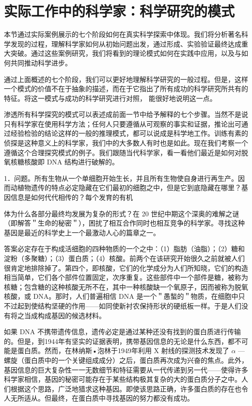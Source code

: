 \section{实际工作中的科学家：科学研究的模式}

\begin{logicbox}[title=引言]
本节通过实际案例展示的七个阶段如何在真实科学探索中体现。我们将分析著名科学发现的过程，理解科学家如何从初始问题出发，通过形成、实验验证最终达成重大突破。通过这些案例研究，我们将看到的理论模式如何在实践中应用，以及与如何共同推动科学进步。
\end{logicbox}

通过上面概述的七个阶段，我们可以更好地理解科学研究的一般过程。但是，这样一个模式的价值不在于抽象的描述，而在于它指出了所有成功的科学研究所共有的特征。将这一模式与成功的科学研究进行对照， 能很好地说明这一点。

渗透所有科学探究的模式可以表述成前面一节中给予解释的七个步骤。当然不是说只有科学家在使用科学方法；任何人只要遵循从可观察的事实和证据，推论出可通过经验检验的结论这样的一般的推理模式，都可以说成是科学地工作。训练有素的侦探是这种意义上的科学家，我们中的大多数人有时也是如此。现在我们考察一个遵循这个合理探究模式的例子。我们跟随当代科学家，看一看他们最近是如何对脱氧核糖核酸即 DNA 结构进行破解的。\cite{watson1968}

1．问题。所有生物从一个单细胞开始生长，并且所有生物使自身进行再生产。因而动植物遗传的特点必定隐藏在它们最初的细胞之中，但是它到底隐藏在哪里？基因信息是如何代代相传的？每个发育的有机

体为什么各部分最终均发展为复杂的形式？在 20 世纪中期这个深奥的难解之谜（即解答＂生命的秘密＂），困扰了相互合作同时也相互竞争的科学家。寻找这种基因是最近的科学史上一个最激动人心的篇章之一。

答案必定存在于构成活细胞的四种物质的一个之中：（1）脂肪（油脂）；（2）糖和淀粉（多聚糖）；（3）蛋白质；（4）核酸。前两个在该研究开始很久之前就被人们很肯定地排除掉了。第四个，即核酸，它们的化学成分为人们所知晓，它们的构造相当简单，它们各个部件位置固定，次序重复。这些部件中一个部件是糖，被称为核糖；包含糖的这种核酸无所不在，其中一种核酸缺一个氧原子，因而被称为脱氧核酸，或 DNA。那时，人们普遍相信 DNA 是一个＂愚蝵的＂物质，在细胞中只不过起到使结构坚硬的作用——如同使新衬农保持形状的硬纸板一样。于是人们没有将之当成构成基因的候选材料。

如果 DNA 不携带遗传信息，遗传必定是通过某种还没有找到的蛋白质进行传输的。但是，到1944年有坚实的证据表明，携带基因信息的无论是什么东西，都不可能是蛋白质。然而，在林纳斯•泡林于1949年利用 X 射线的探测技术发现了 $\alpha$ —螺旋（蛋白质中的一个关键组成成分）之后，蛋白质再次成为兴奋的焦点。此外，基因信息的巨大复杂性一一无数细节和特征需要从一代传递到另一代——使得许多科学家相信，基因的秘密可能存在于某些结构极其复杂的大的蛋白质分子之中。人们根据这个思路，广泛地猎求这种基因。即使该思路正确，许多蛋白质的存在也令人无所适从。但最终，在蛋白质中寻找基因的努力都没有成功。

